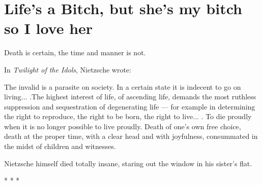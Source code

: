 \section{Life’s a Bitch, but she’s my bitch so I love her}

\begin{quotex}
Death is certain, the time and manner is not.
\end{quotex}

In \emph{Twilight of the Idols}, Nietzsche wrote:

\begin{quotex}
The invalid is a parasite on society. In a certain state it is indecent to go on living... .The highest interest of life, of ascending life, demands the most ruthless suppression and sequestration of degenerating life --- for example in determining the right to reproduce, the right to be born, the right to live... . To die proudly when it is no longer possible to live proudly. Death of one's own free choice, death at the proper time, with a clear head and with joyfulness, consummated in the midst of children and witnesses.
\end{quotex}


Nietzsche himself died totally insane, staring out the window in his sister's flat.



\begin{center}* * *\end{center}

